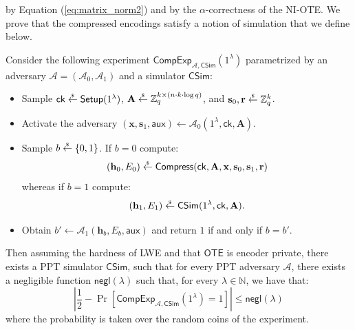 \documentclass{theoretics}
\newcommand{\getsr}{\overset{\raisebox{-1pt}{$\scriptscriptstyle \$$}}{\gets}}
\newcommand{\sample}{\getsr}
\newcommand{\OTE}{\mathsf{OTE}}
\newcommand{\N}{\mathbb{N}}
\newcommand{\Z}{\mathbb{Z}}
\newcommand{\negl}{\mathsf{negl}}
\renewcommand{\sec}{\ensuremath{\lambda}}
\newcommand{\aux}{\mathsf{aux}}
\newcommand{\Sim}{\mathsf{Sim}}
\newcommand{\Adv}{\mathcal{A}}
\newcommand{\Compress}{\mathsf{Compress}}
\newcommand{\ck}{\mathsf{ck}}
\newcommand{\algofont}[1]{\ensuremath{\mathsf{#1}}}
\newcommand{\Setup}{{\algofont{Setup}}}
\newcommand{\thmlab}[1]{\label{thm:#1}}
\newcommand\bbbone{1}
\begin{document}
by Equation (\ref{eq:matrix_norm2}) and by the $\alpha$-correctness of the NI-OTE.
We prove that the compressed encodings satisfy a notion of simulation that we define below.
\begin{theorem}[Simulatability]\thmlab{expansion}
Consider the following experiment $\mathsf{CompExp}_{\mathcal{A}, \mathsf{C}\Sim}(\bbbone^\sec)$ parametrized by an adversary $\mathcal{A} = (\mathcal{A}_0, \mathcal{A}_1)$ and a simulator $\mathsf{C}\Sim$:
\begin{itemize}
\item Sample $\ck\sample\Setup(\bbbone^\sec)$, $\mathbf{A}\sample\Z_q^{k\times (n\cdot k\cdot \log q)}$, and $\mathbf{s}_0, \mathbf{r}\sample\Z_q^k$.
\item Activate the adversary $(\mathbf{x}, \mathbf{s}_1, \aux)\gets\Adv_0(\bbbone^\sec, \ck, \mathbf{A})$.
\item Sample $b\sample\{0, 1\}$. If $b = 0$ compute:
\[
(\mathbf{h}_0, E_0)\sample\Compress(\ck, \mathbf{A}, \mathbf{x}, \mathbf{s}_0, \mathbf{s}_1, \mathbf{r})
\]
whereas if $b=1$ compute:
\[
(\mathbf{h}_1, E_1)\sample\mathsf{C}\Sim(\bbbone^\sec, \ck, \mathbf{A}).
\]
\item Obtain $b' \gets \Adv_1(\mathbf{h}_b, E_b, \aux)$ and return $1$ if and only if $b=b'$.
\end{itemize}
Then assuming the hardness of LWE and that $\OTE$ is encoder private, there exists a PPT simulator $\mathsf{C}\Sim$, such that for every PPT adversary $\mathcal{A}$, there exists a negligible function $\negl(\sec)$ such that, for every $\sec\in\N$, we have that:
\[
\left|\frac{1}{2} - \Pr\left[\mathsf{CompExp}_{\mathcal{A}, \mathsf{C}\Sim}(\bbbone^\sec) = 1\right] \right|\le\negl(\sec)
\]
where the probability is taken over the random coins of the experiment.
\end{theorem}
\end{document}
